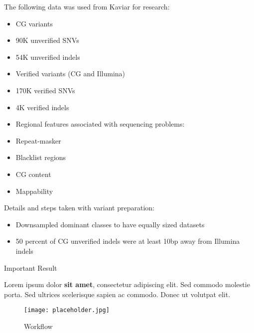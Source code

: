 The following data was used from Kaviar for research:

\begin{itemize}
\item CG variants
\item 90K unverified SNVs
\item 54K unverified indels
\item Verified variants (CG and Illumina)
\item 170K verified SNVs
\item 4K verified indels

\item Regional features associated with sequencing problems:
\item Repeat-masker
\item Blacklist regions
\item CG content
\item Mappability

\end{itemize}

Details and steps taken with variant preparation:

\begin{itemize}
\item Downsampled dominant classes to have equally sized datasets
\item 50 percent of CG unverified indels were at least 10bp away from Illumina indels
\end{itemize}

\begin{alertblock}{Important Result}

Lorem ipsum dolor \textbf{sit amet}, consectetur adipiscing elit. Sed commodo molestie porta. Sed ultrices scelerisque sapien ac commodo. Donec ut volutpat elit.

\end{alertblock} 

\begin{figure}
\texttt{[image: placeholder.jpg]}
\caption{Workflow}
\end{figure}

